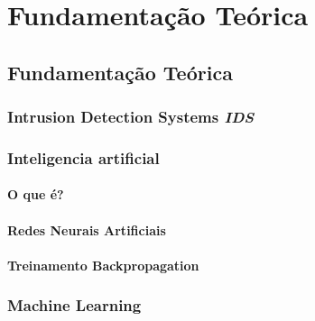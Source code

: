 \part{Fundamentação Teórica}
\chapter[Fundamentação Teórica]{Fundamentação Teórica}

\section{Intrusion Detection Systems \textit{IDS}}
    

\section{Inteligencia artificial}
    \subsection{O que é?}
        
    \subsection{Redes Neurais Artificiais}
        
    \subsection{Treinamento Backpropagation}
        

\section{Machine Learning}
    